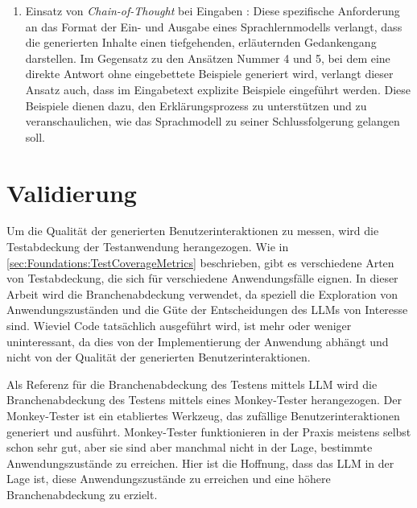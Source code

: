 \begin{enumerate}
{    Klick auf \dq zurück\dq
    \\
    System: Hier ist die neue HTML-Repräsentation ...
    }
    \item Einsatz von \textit{Chain-of-Thought} bei Eingaben  \cite{chain-of-thought}:
    Diese spezifische Anforderung an das Format der Ein- und Ausgabe eines Sprachlernmodells verlangt, dass die generierten Inhalte einen tiefgehenden, erläuternden Gedankengang darstellen.
    Im Gegensatz zu den Ansätzen Nummer 4 und 5, bei dem eine direkte Antwort ohne eingebettete Beispiele generiert wird, verlangt dieser Ansatz auch, dass im Eingabetext explizite Beispiele eingeführt werden.
    Diese Beispiele dienen dazu, den Erklärungsprozess zu unterstützen und zu veranschaulichen, wie das Sprachmodell zu seiner Schlussfolgerung gelangen soll.
\end{enumerate}

\section{Validierung}
\label{sec:vaildation}

Um die Qualität der generierten Benutzerinteraktionen zu messen, wird die Testabdeckung der Testanwendung herangezogen.
Wie in \ref{sec:Foundations:TestCoverageMetrics} beschrieben, gibt es verschiedene Arten von Testabdeckung, die sich für verschiedene Anwendungsfälle eignen.
In dieser Arbeit wird die Branchenabdeckung verwendet, da speziell die Exploration von Anwendungszuständen und die Güte der Entscheidungen des LLMs von Interesse sind.
Wieviel Code tatsächlich ausgeführt wird, ist mehr oder weniger uninteressant, da dies von der Implementierung der Anwendung abhängt und nicht von der Qualität der generierten Benutzerinteraktionen.

Als Referenz für die Branchenabdeckung des Testens mittels LLM wird die Branchenabdeckung des Testens mittels eines Monkey-Tester herangezogen.
Der Monkey-Tester ist ein etabliertes Werkzeug, das zufällige Benutzerinteraktionen generiert und ausführt.
Monkey-Tester funktionieren in der Praxis meistens selbst schon sehr gut, aber sie sind aber manchmal nicht in der Lage, bestimmte Anwendungszustände zu erreichen.
Hier ist die Hoffnung, dass das LLM in der Lage ist, diese Anwendungszustände zu erreichen und eine höhere Branchenabdeckung zu erzielt.

